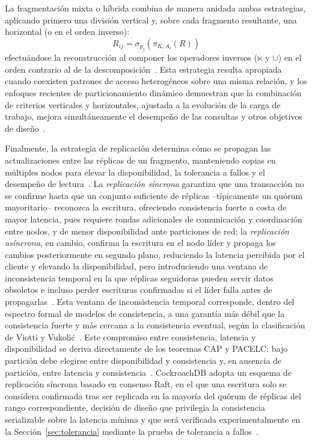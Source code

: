 \documentclass[11pt,a4paper]{article}
\begin{document}
La fragmentaci\'on mixta o h\'ibrida combina de manera anidada ambas
estrategias, aplicando primero una divisi\'on vertical y, sobre cada
fragmento resultante, una horizontal (o en el orden inverso):
\begin{equation}
R_{ij} = \sigma_{p_j}(\pi_{K,A_i}(R))
\end{equation}
efectu\'andose la reconstrucci\'on al componer los operadores inversos
($\ltimes$ y $\cup$) en el orden contrario al de la descomposici\'on~\cite{nashat2018,mehta2022}.
Esta estrategia resulta apropiada cuando coexisten patrones de acceso
heterog\'eneos sobre una misma relaci\'on, y los enfoques recientes de
particionamiento din\'amico demuestran que la combinaci\'on de criterios
verticales y horizontales, ajustada a la evoluci\'on de la carga de trabajo,
mejora simult\'aneamente el desempe\~no de las consultas y otros objetivos de
dise\~no~\cite{ge2024,mehta2022}.

Finalmente, la estrategia de replicaci\'on determina c\'omo se propagan las
actualizaciones entre las r\'eplicas de un fragmento, manteniendo copias en
m\'ultiples nodos para elevar la disponibilidad, la tolerancia a fallos y el
desempe\~no de lectura~\cite{rambabu2024,mokadem2022}. La \emph{replicaci\'on
s\'incrona} garantiza que una transacci\'on no se confirme hasta que un
conjunto suficiente de r\'eplicas --t\'ipicamente un qu\'orum mayoritario--
reconozca la escritura, ofreciendo consistencia fuerte a costa de mayor
latencia, pues requiere rondas adicionales de comunicaci\'on y coordinaci\'on
entre nodos, y de menor disponibilidad ante particiones de red; la
\emph{replicaci\'on as\'incrona}, en cambio, confirma la escritura en el
nodo l\'ider y propaga los cambios posteriormente en segundo plano,
reduciendo la latencia percibida por el cliente y elevando la
disponibilidad, pero introduciendo una ventana de inconsistencia temporal en
la que r\'eplicas seguidoras pueden servir datos obsoletos e incluso perder
escrituras confirmadas si el l\'ider falla antes de propagarlas~\cite{rambabu2024,kleppmann2017}.
Esta ventana de inconsistencia temporal corresponde, dentro del espectro
formal de modelos de consistencia, a una garant\'ia m\'as d\'ebil que la
consistencia fuerte y m\'as cercana a la consistencia eventual, seg\'un la
clasificaci\'on de Viotti y Vukoli\'c~\cite{viotti2016}.
Este compromiso entre consistencia, latencia y disponibilidad se deriva
directamente de los teoremas CAP y PACELC: bajo partici\'on debe elegirse
entre disponibilidad y consistencia y, en ausencia de partici\'on, entre
latencia y consistencia~\cite{ahmed2023,mokadem2022}. CockroachDB adopta un
esquema de replicaci\'on s\'incrona basado en consenso Raft, en el que una
escritura solo se considera confirmada tras ser replicada en la mayor\'ia
del qu\'orum de r\'eplicas del rango correspondiente, decisi\'on de dise\~no
que privilegia la consistencia serializable sobre la latencia m\'inima y que
ser\'a verificada experimentalmente en la Secci\'on~\ref{sec:tolerancia} mediante la prueba de
tolerancia a fallos~\cite{taft2020,ongaro2014}.
\end{document}
